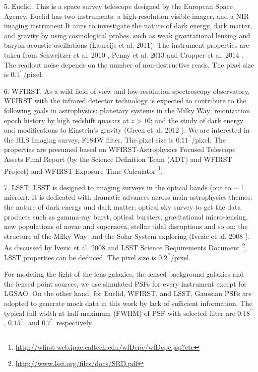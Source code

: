 \documentclass[a4paper,11pt]{article}
\begin{document}
    5. Euclid. This is a space survey telescope designed by the European Space Agency. Euclid has two instruments: a high-resolution visible imager, and a NIR imaging instrument.It aims to investigate the nature of dark energy, dark matter, and gravity by using cosmological probes, such as weak gravitational lensing and baryon acoustic oscillations (Laureijs et al. 2011). The instrument properties are taken from Schweitzer et al. 2010 \cite{2010SPIE.7731E..1KS}, Penny et al. 2013 \cite{2013MNRAS.434....2P} and Cropper et al. 2014 \cite{2014SPIE.9143E..0JC}. The readout noise depends on the number of non-destructive reads. The pixel size is $0.1^{\prime\prime}$/pixel.
    
    6. WFIRST. As a wild field of view and low-resolution spectroscopy observatory, WFIRST with the infrared detector technology is expected to contribute to the following goals in astrophysics: planetary systems in the Milky Way; reionization epoch history by high redshift quasars at $z>10$; and the study of dark energy and modifications to Einstein's gravity (Green et al. 2012 \cite{2012arXiv1208.4012G}). We are interested in the HLS Imaging survey, F184W filter. The pixel size is $0.11^{\prime\prime}$/pixel. The properties are presumed based on WFIRST-Astrophysics Focused Telescope Assets Final Report (by the Science Definition Team (ADT) and WFIRST Project) and WFIRST Exposure Time Calculator \footnote{\url{http://wfirst-web.ipac.caltech.edu/wfDepc/wfDepc.jsp?etc}}.
    
    7. LSST. LSST is designed to imaging surveys in the optical bands (out to $\sim$ 1 micron). It is dedicated with dramatic advances across main astrophysics themes: the nature of dark energy and dark matter; optical sky survey to get the data products such as gamma-ray burst, optical bursters, gravitational micro-lensing, new populations of novae and supernova, stellar tidal disruptions and so on; the structure of the Milky Way; and the Solar System exploring (Ivezic et al. 2008 \cite{2008arXiv0805.2366I}). As discussed by Ivezic et al. 2008 and LSST Science Requirements Document \footnote{\url{http://www.lsst.org/files/docs/SRD.pdf}}, LSST properties can be deduced. The pixel size is $0.2^{\prime\prime}$/pixel.

For modeling the light of the lens galaxies, the lensed background galaxies and the lensed point sources,
we use simulated PSFs for every instrument except for LGSAO.
On the other hand, for Euclid, WFIRST, and LSST, Gaussian PSFs are adopted to generate mock data in this work by lack of sufficient information. The typical full width at half maximum (FWHM) of PSF with selected filter are $0.18^{\prime\prime}$, $0.15^{\prime\prime}$, and $0.7^{\prime\prime}$ respectively.
\end{document}
